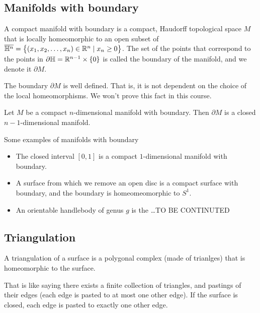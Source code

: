 \documentclass[11pt,a4paper]{article}
\begin{document}
\subsection{Manifolds with boundary}
\begin{definition}
  A compact manifold with boundary is a compact, Haudorff topological 
  space $M$ that is locally homeomorphic to an open subset of
  $\overline {\mathbb H^n} = \set{(x_1,x_2,\dots,x_n) \in 
  \mathbb{R}^n \mid x_n \geq 0}$.
  The set of the points that correspond to the points in
  $\partial \mathbb H = \mathbb{R}^{n-1} \times \set{0}$ is called the boundary of
  the manifold, and we denote it $\partial M$.
\end{definition}
\begin{remark}
  The boundary $\partial M$ is well defined.
  That is, it is not dependent on the choice of the local homeomorphisms.
  We won't prove this fact in this course.
\end{remark}

\begin{proposition}
  Let $M$ be a compact $n$-dimensional manifold with boundary.
  Then $\partial M$ is a closed $n-1$-dimensional manifold.
\end{proposition}
Some examples of manifolds with boundary
\begin{itemize}
  \item The closed interval $[0,1]$ is a compact $1$-dimensional manifold
    with boundary.
  \item A surface from which we remove an open disc is a compact surface
    with boundary, and the boundary is homeomeomorphic to $S^1$.
  \item An orientable handlebody of genus $g$ is the \dots TO BE CONTINUTED
\end{itemize}

\subsection{Triangulation}
\begin{definition}
  A triangulation of a surface is a polygonal complex (made of trianlges)
  that is homeomorphic to the surface.
\end{definition}
\begin{remark}
  That is like saying there exists a finite collection of triangles, and
  pastings of their edges (each edge is pasted to at most one other edge).
  If the surface is closed, each edge is pasted to exactly one other edge.
\end{remark}
\end{document}
